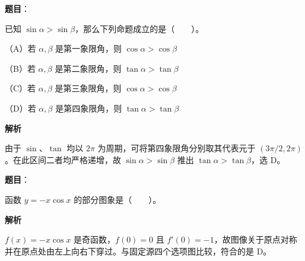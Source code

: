 \begin{answer}

\textbf{题目}：

已知 $\sin\alpha>\sin\beta$，那么下列命题成立的是\mbox{（　　）}。

（A）若 $\alpha,\beta$ 是第一象限角，则 $\cos\alpha>\cos\beta$

（B）若 $\alpha,\beta$ 是第二象限角，则 $\tan\alpha>\tan\beta$

（C）若 $\alpha,\beta$ 是第三象限角，则 $\cos\alpha>\cos\beta$

（D）若 $\alpha,\beta$ 是第四象限角，则 $\tan\alpha>\tan\beta$

\textbf{解析}

由于 $\sin$、$\tan$ 均以 $2\pi$ 为周期，可将第四象限角分别取其代表元于 $(3\pi/2,2\pi)$。在此区间二者均严格递增，故 $\sin\alpha>\sin\beta$ 推出 $\tan\alpha>\tan\beta$，选 D。


\end{answer}
\begin{answer}

\textbf{题目}：

函数 $y=-x\cos x$ 的部分图象是\mbox{（　　）}。
\nopagebreak[4]
\begin{center}\end{center}
\nopagebreak[4]
\textbf{解析}

$f(x)=-x\cos x$ 是奇函数，$f(0)=0$ 且 $f'(0)=-1$，故图像关于原点对称并在原点处由左上向右下穿过。与固定源四个选项图比较，符合的是 D。


\end{answer}
